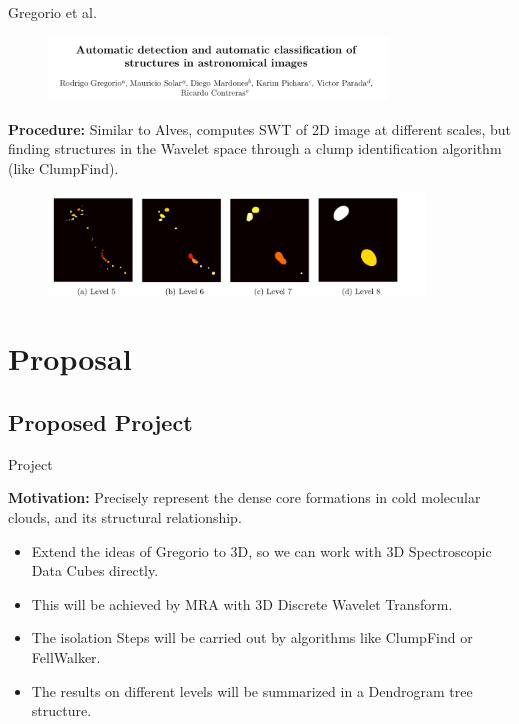 \documentclass{beamer}
\begin{document}
\begin{frame}{Gregorio et al.}

\begin{figure}[htpb!]
\centering
\includegraphics[width=9cm]{gregorio}
\end{figure}

\textbf{Procedure:} Similar to Alves, computes SWT of 2D image at different scales, but
finding structures in the Wavelet space through a clump identification algorithm (like
ClumpFind).

\begin{figure}[htpb!]
\centering
\includegraphics[width=10cm]{gregorio_mra}
\end{figure}

\end{frame}



\section{Proposal}

\subsection{Proposed Project}

\begin{frame}{Project}

\textbf{Motivation:} Precisely represent the dense core formations in cold molecular clouds,
and its structural relationship.

\begin{itemize}
  \item Extend the ideas of Gregorio to 3D, so we can work with 3D Spectroscopic
  Data Cubes directly.
  \item This will be achieved by MRA with 3D Discrete Wavelet Transform.
  \item The isolation Steps will be carried out by algorithms like ClumpFind or FellWalker.
  \item The results on different levels will be summarized in a Dendrogram tree structure.
\end{itemize}
\end{frame}
\end{document}
